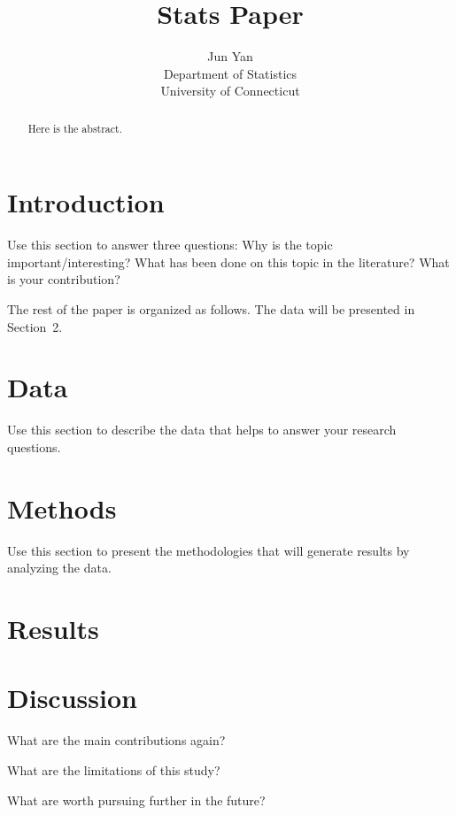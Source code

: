\documentclass[12pt]{article}
\title{Stats Paper}
\author{Jun Yan\\
  Department of Statistics\\
  University of Connecticut
}
\begin{document}
\maketitle

\begin{abstract}
Here is the abstract.  
\end{abstract}


\section{Introduction}
\label{sec:intro}

Use this section to answer three questions:
Why is the topic important/interesting?
What has been done on this topic in the literature?
What is your contribution?


The rest of the paper is organized as follows.
The data will be presented in Section~2.


\section{Data}
\label{sec:data}

Use this section to describe the data that helps to answer your research questions.

\section{Methods}
\label{sec:meth}

Use this section to present the methodologies that will generate results by analyzing the data.

\section{Results}
\label{sec:results}


\section{Discussion}
\label{sec:disc}

What are the main contributions again?

What are the limitations of this study?

What are worth pursuing further in the future?
\end{document}
